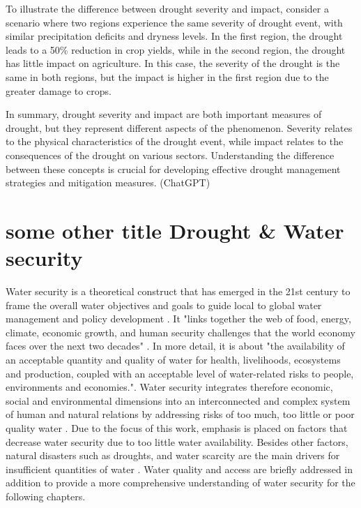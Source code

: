 {To illustrate the difference between drought severity and impact, consider a scenario where two regions experience the same severity of drought event, with similar precipitation deficits and dryness levels. In the first region, the drought leads to a 50\% reduction in crop yields, while in the second region, the drought has little impact on agriculture. In this case, the severity of the drought is the same in both regions, but the impact is higher in the first region due to the greater damage to crops.

In summary, drought severity and impact are both important measures of drought, but they represent different aspects of the phenomenon. Severity relates to the physical characteristics of the drought event, while impact relates to the consequences of the drought on various sectors. Understanding the difference between these concepts is crucial for developing effective drought management strategies and mitigation measures. (ChatGPT)




\section{some other title Drought \& Water security} %

Water security is a theoretical construct that has emerged in the 21st century to frame the overall water objectives and goals to guide local to global water management and policy development \autocite{sadoffWaterSecurity2020a}. It "links together the web of food, energy, climate, economic growth, and human security challenges that the world economy faces over the next two decades" \autocite[5]{wefBubbleCloseBursting2009}. In more detail, it is about "the availability of an acceptable quantity and quality of water for health, livelihoods, ecosystems and production, coupled with an acceptable level of water-related risks to people, environments and economies."\autocite{greySinkSwimWater2007}.
Water security integrates therefore economic, social and environmental dimensions into an interconnected and complex system of human and natural relations by addressing risks of too much, too little or poor quality water \autocite{vanbeekWaterSecurityPutting2014, mishraWaterSecurityChanging2021}. Due to the focus of this work, emphasis is placed on factors that decrease water security due to too little water availability. Besides other factors, natural disasters such as droughts, and water scarcity are the main drivers for insufficient quantities of water \autocite{caretta2022water}. Water quality and access are briefly addressed in addition to provide a more comprehensive  understanding of water security for the following chapters.

}
